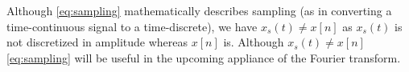 Although \eqref{eq:sampling} mathematically describes sampling (as in converting a time-continuous signal to a time-discrete), we have $x_s(t)\neq x[n]$ as $x_s(t)$ is not discretized in amplitude whereas $x[n]$ is. Although $x_s(t)\neq x[n]$ \eqref{eq:sampling} will be useful in the upcoming appliance of the Fourier transform.
